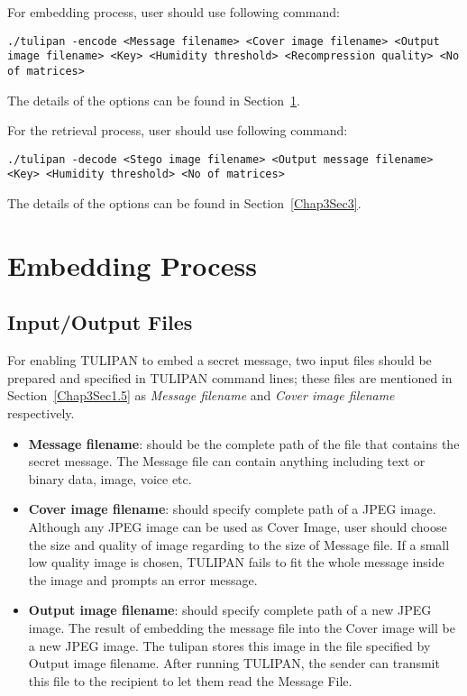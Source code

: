 For embedding process, user should use following command:

\texttt{./tulipan -encode  <Message filename> <Cover image filename> <Output image filename> <Key> <Humidity threshold> <Recompression quality> <No of matrices>}

The details of the options can be found in Section~\ref{Chap3Sec2}.

For the retrieval process, user should use following command:

\texttt{./tulipan -decode <Stego image filename> <Output message filename> <Key> <Humidity threshold> <No of matrices>}

The details of the options can be found in Section~\ref{Chap3Sec3}.

\section{Embedding Process}
\label{Chap3Sec2}

\subsection{Input/Output Files}
For enabling TULIPAN to embed a secret message, two input files should be prepared and specified
in TULIPAN command lines; these files are mentioned in Section~\ref{Chap3Sec1.5} as {\it Message filename} and {\it Cover image filename} respectively.

\begin{itemize}
  \item {\bf Message filename}: should be the complete path of the file that contains the secret message. The Message file can contain anything including text or binary data, image, voice etc. 

  \item {\bf Cover image filename}: should specify complete path of a JPEG image. Although any JPEG image can be used as Cover Image, user should choose the size and quality of image regarding to the size of Message file. If a small low quality image is chosen, TULIPAN fails to fit the whole message inside the image and prompts an error message.

  \item {\bf Output image filename}: should specify complete path of a new JPEG image. The result of embedding the message file into the Cover image will be a new JPEG image. The tulipan stores this image in the file specified by {Output image filename}. After running TULIPAN, the sender can transmit this file to the recipient to let them read the Message File.
\end{itemize}

